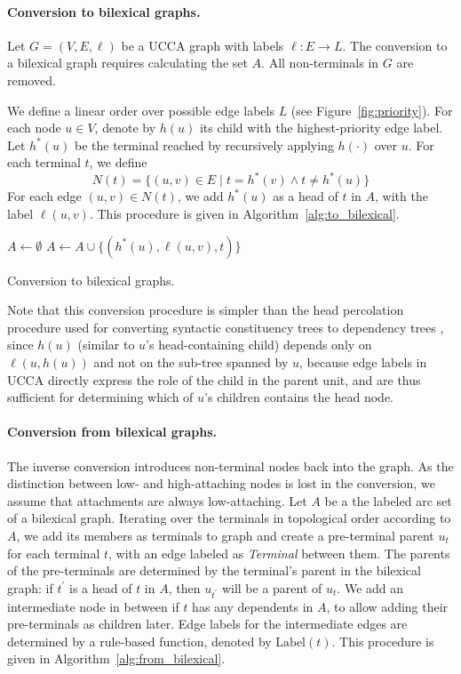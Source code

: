 \documentclass[11pt,a4paper]{article}
\newcommand{\figref}[1]{Figure~\ref{#1}}
\begin{document}
\paragraph{Conversion to bilexical graphs.}
Let $G=(V,E,\ell)$ be a UCCA graph with labels $\ell:E\rightarrow L$.
The conversion to a bilexical graph requires calculating the set $A$.
All non-terminals in $G$ are removed.

We define a linear order over possible edge labels $L$ (see \figref{fig:priority}).
For each node $u \in V$, denote by $h(u)$ its child with the highest-priority edge label.
Let $h^*(u)$ be the terminal reached by recursively applying $h(\cdot)$ over $u$.
For each terminal $t$, we define
\[
N(t) = \{(u,v)\in E \;|\; t=h^*(v) \wedge t \neq h^*(u) \}
\]
For each edge $(u,v)\in N(t)$, we add $h^*(u)$ as a head of $t$ in $A$,
with the label $\ell(u,v)$.
This procedure is given in Algorithm~\ref{alg:to_bilexical}.

\begin{algorithm}[ht]
 $A \leftarrow \emptyset$\;
  {
   {
   $A \leftarrow A \cup \{(h^*(u), \ell(u, v), t)\}$\;
  }
 }
 \caption{Conversion to bilexical graphs.}
 \label{alg:to_bilexical}
\end{algorithm}

Note that this conversion procedure
is simpler than the head percolation procedure used for converting syntactic constituency
trees to dependency trees \cite{Coll:97},
since $h(u)$ (similar to $u$'s head-containing child)
depends only on $\ell(u,h(u))$ and not on the sub-tree spanned by $u$,
because edge labels in UCCA directly express the role of the child in the parent unit, and
are thus sufficient for determining which of $u$'s children contains the head node.

\paragraph{Conversion from bilexical graphs.}
The inverse conversion introduces non-terminal nodes back into the graph.
As the distinction between low- and high-attaching nodes is lost in the
conversion, we assume that attachments are always
low-attaching.
Let $A$ be a the labeled arc set of a bilexical graph.
Iterating over the terminals in topological order according to $A$,
we add its members as terminals to graph
and create a pre-terminal parent $u_t$ for each terminal $t$,
with an edge labeled as \textit{Terminal} between them.
The parents of the pre-terminals are determined by the terminal's parent in the bilexical
graph: if $t^\prime$ is a head of $t$ in $A$, then $u_{t^\prime}$ will be a parent of $u_t$.
We add an intermediate node in between if $t$ has any dependents in $A$,
to allow adding their pre-terminals as children later.
Edge labels for the intermediate edges are determined by a rule-based function, denoted by
$\mathrm{Label}(t)$.
This procedure is given in Algorithm~\ref{alg:from_bilexical}.
\end{document}
